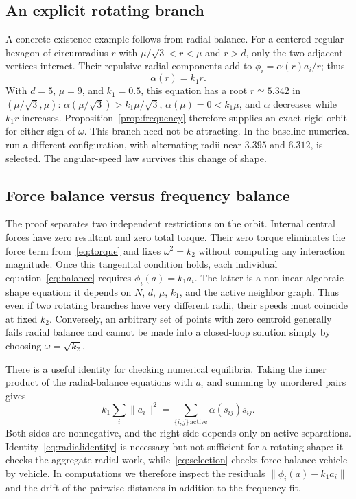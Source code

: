 \documentclass[conference]{IEEEtran}
\newcommand{\norm}[1]{\lVert#1\rVert}
\begin{document}
\subsection{An explicit rotating branch}
A concrete existence example follows from radial balance. For a centered regular hexagon of circumradius $r$ with $\mu/\sqrt3<r<\mu$ and $r>d$, only the two adjacent vertices interact. Their repulsive radial components add to $\phi_i=\alpha(r)a_i/r$; thus
\begin{equation}
 \alpha(r)=k_1r.\label{eq:hex}
\end{equation}
With $d=5$, $\mu=9$, and $k_1=0.5$, this equation has a root $r\simeq5.342$ in $(\mu/\sqrt3,\mu)$: $\alpha(\mu/\sqrt3)>k_1\mu/\sqrt3$, $\alpha(\mu)=0<k_1\mu$, and $\alpha$ decreases while $k_1r$ increases. Proposition~\ref{prop:frequency} therefore supplies an exact rigid orbit for either sign of $\omega$. This branch need not be attracting. In the baseline numerical run a different configuration, with alternating radii near $3.395$ and $6.312$, is selected. The angular-speed law survives this change of shape.

\subsection{Force balance versus frequency balance}
The proof separates two independent restrictions on the orbit. Internal central forces have zero resultant and zero total torque. Their zero torque eliminates the force term from~\eqref{eq:torque} and fixes $\omega^2=k_2$ without computing any interaction magnitude. Once this tangential condition holds, each individual equation~\eqref{eq:balance} requires $\phi_i(a)=k_1a_i$. The latter is a nonlinear algebraic shape equation: it depends on $N$, $d$, $\mu$, $k_1$, and the active neighbor graph. Thus even if two rotating branches have very different radii, their speeds must coincide at fixed $k_2$. Conversely, an arbitrary set of points with zero centroid generally fails radial balance and cannot be made into a closed-loop solution simply by choosing $\omega=\sqrt{k_2}$.

There is a useful identity for checking numerical equilibria. Taking the inner product of the radial-balance equations with $a_i$ and summing by unordered pairs gives
\begin{equation}
 k_1\sum_i\norm{a_i}^2
 =\sum_{\{i,j\}\,\mathrm{active}}\alpha(s_{ij})s_{ij}.
 \label{eq:radialidentity}
\end{equation}
Both sides are nonnegative, and the right side depends only on active separations. Identity~\eqref{eq:radialidentity} is necessary but not sufficient for a rotating shape: it checks the aggregate radial work, while~\eqref{eq:selection} checks force balance vehicle by vehicle. In computations we therefore inspect the residuals $\norm{\phi_i(a)-k_1a_i}$ and the drift of the pairwise distances in addition to the frequency fit.
\end{document}
